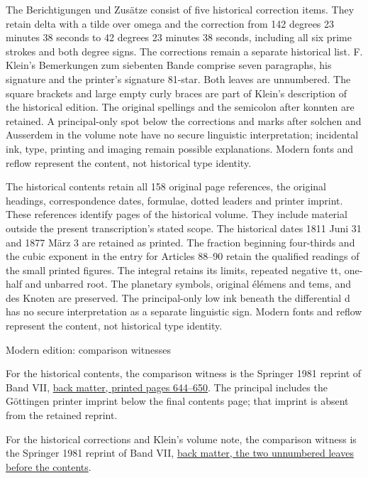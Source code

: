 The Berichtigungen und Zusätze consist of five historical correction items. They retain delta with a tilde over omega and the correction from 142 degrees 23 minutes 38 seconds to 42 degrees 23 minutes 38 seconds, including all six prime strokes and both degree signs. The corrections remain a separate historical list. F. Klein’s Bemerkungen zum siebenten Bande comprise seven paragraphs, his signature and the printer’s signature 81-star. Both leaves are unnumbered. The square brackets and large empty curly braces are part of Klein’s description of the historical edition. The original spellings and the semicolon after konnten are retained. A principal-only spot below the corrections and marks after solchen and Ausserdem in the volume note have no secure linguistic interpretation; incidental ink, type, printing and imaging remain possible explanations. Modern fonts and reflow represent the content, not historical type identity.

The historical contents retain all 158 original page references, the original headings, correspondence dates, formulae, dotted leaders and printer imprint. These references identify pages of the historical volume. They include material outside the present transcription’s stated scope. The historical dates 1811 Juni 31 and 1877 März 3 are retained as printed. The fraction beginning four-thirds and the cubic exponent in the entry for Articles 88–90 retain the qualified readings of the small printed figures. The integral retains its limits, repeated negative tt, one-half and unbarred root. The planetary symbols, original élémens and tems, and des Knoten are preserved. The principal-only low ink beneath the differential d has no secure interpretation as a separate linguistic sign. Modern fonts and reflow represent the content, not historical type identity.

\par\medskip
{\large Modern edition: comparison witnesses\par}\nopagebreak[4]

For the historical contents, the comparison witness is the Springer 1981 reprint of Band VII, \href{https://link.springer.com/content/pdf/bbm:978-3-642-92478-1/1}{back matter, printed pages 644–650}. The principal includes the Göttingen printer imprint below the final contents page; that imprint is absent from the retained reprint.



For the historical corrections and Klein’s volume note, the comparison witness is the Springer 1981 reprint of Band VII, \href{https://link.springer.com/content/pdf/bbm:978-3-642-92478-1/1}{back matter, the two unnumbered leaves before the contents}.



